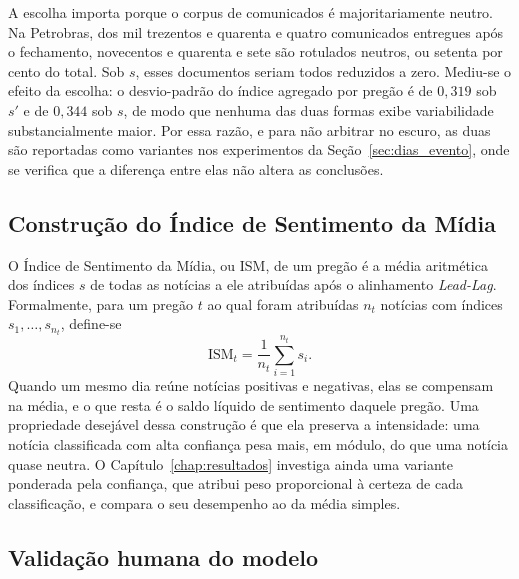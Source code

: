 A escolha importa porque o corpus de comunicados é majoritariamente neutro. Na Petrobras, dos mil trezentos e quarenta e quatro comunicados entregues após o fechamento, novecentos e quarenta e sete são rotulados neutros, ou setenta por cento do total. Sob $s$, esses documentos seriam todos reduzidos a zero. Mediu-se o efeito da escolha: o desvio-padrão do índice agregado por pregão é de $0{,}319$ sob $s'$ e de $0{,}344$ sob $s$, de modo que nenhuma das duas formas exibe variabilidade substancialmente maior. Por essa razão, e para não arbitrar no escuro, as duas são reportadas como variantes nos experimentos da Seção~\ref{sec:dias_evento}, onde se verifica que a diferença entre elas não altera as conclusões.

\subsection{Construção do Índice de Sentimento da Mídia}
\label{sec:metodologia_ism}

O Índice de Sentimento da Mídia, ou ISM, de um pregão é a média aritmética dos índices $s$ de todas as notícias a ele atribuídas após o alinhamento \textit{Lead-Lag}. Formalmente, para um pregão $t$ ao qual foram atribuídas $n_t$ notícias com índices $s_{1}, \dots, s_{n_t}$, define-se
\begin{equation}
\text{ISM}_t = \frac{1}{n_t} \sum_{i=1}^{n_t} s_{i}.
\end{equation}
Quando um mesmo dia reúne notícias positivas e negativas, elas se compensam na média, e o que resta é o saldo líquido de sentimento daquele pregão. Uma propriedade desejável dessa construção é que ela preserva a intensidade: uma notícia classificada com alta confiança pesa mais, em módulo, do que uma notícia quase neutra. O Capítulo~\ref{chap:resultados} investiga ainda uma variante ponderada pela confiança, que atribui peso proporcional à certeza de cada classificação, e compara o seu desempenho ao da média simples.

\subsection{Validação humana do modelo}

